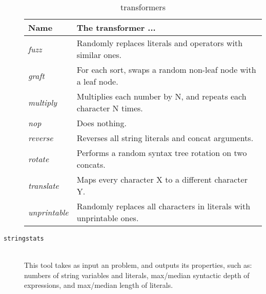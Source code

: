 \begin{description}
            \begin{table}
                \centering
                \begin{tabular}{|l|l|}
                    \hline
                    \textbf{Name}        & \textbf{The transformer ...} \\ \hline
                    \textit{fuzz}        & Randomly replaces literals and operators with similar ones. \\ \hline
                    \textit{graft}       & For each sort, swaps a random non-leaf node with a leaf node. \\ \hline
                    \textit{multiply}    & Multiplies each number by N, and repeats each character N times. \\ \hline
                    \textit{nop}         & Does nothing. \\ \hline
                    \textit{reverse}     & Reverses all string literals and concat arguments. \\ \hline
                    \textit{rotate}      & Performs a random syntax tree rotation on two concats. \\ \hline
                    \textit{translate}   & Maps every character X to a different character Y. \\ \hline
                    \textit{unprintable} & Randomly replaces all characters in literals with unprintable ones. \\ \hline
                \end{tabular}
                \caption{\transformer{} transformers}
                \label{tbl:transformers}
            \end{table}

        \item[\texttt{stringstats}] \hfill \\
            This tool takes as input an \smt{} problem, and outputs its properties, such as: numbers of string variables and literals, max/median syntactic depth of expressions, and max/median length of literals.
            \hfill \\



    \end{description}

